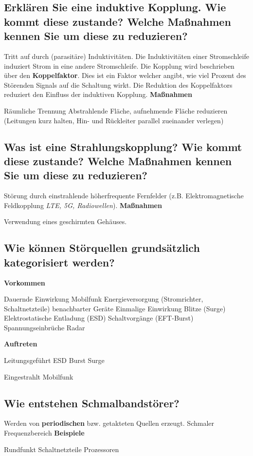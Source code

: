 \subsection{Erklären Sie eine induktive Kopplung. Wie kommt diese zustande? Welche Maßnahmen kennen Sie um diese zu reduzieren?}
Tritt auf durch (parasitäre) Induktivitäten. Die Induktivitäten einer Stromschleife induziert Strom in eine andere Stromschleife.\p
Die Kopplung wird beschrieben über den \textbf{Koppelfaktor}. Dies ist ein Faktor welcher angibt, wie viel Prozent des Störenden Signals auf die Schaltung wirkt. Die Reduktion des Koppelfaktors reduziert den Einfluss der induktiven Kopplung.\p
\textbf{Maßnahmen}
\begin{outline}
  \1 Räumliche Trennung
  \1 Abstrahlende Fläche, aufnehmende Fläche reduzieren (Leitungen kurz halten, Hin- und Rückleiter parallel zueinander verlegen)
\end{outline}

\subsection{Was ist eine Strahlungskopplung? Wie kommt diese zustande? Welche Maßnahmen kennen Sie um diese zu reduzieren?}
Störung durch einstrahlende höherfrequente Fernfelder (z.B. Elektromagnetische Feldkopplung \textit{LTE, 5G, Radiowellen}).\p
%
\textbf{Maßnahmen}
\begin{outline}
  \1 Verwendung eines geschirmten Gehäuses.
\end{outline}

\subsection{Wie können Störquellen grundsätzlich kategorisiert werden?}
\textbf{Vorkommen}
\begin{outline}
  \1 Dauernde Einwirkung
  \2 Mobilfunk
  \2 Energieversorgung (Stromrichter, Schaltnetzteile) benachbarter Geräte
  \1 Einmalige Einwirkung
  \2 Blitze (Surge)
  \2 Elektrostatische Entladung (ESD)
  \2 Schaltvorgänge (EFT-Burst)
  \2 Spannungseinbrüche
  \2 Radar
\end{outline}
%
\textbf{Auftreten}
\begin{outline}
  \1 Leitungsgeführt
  \2 ESD
  \2 Burst
  \2 Surge

  \1 Eingestrahlt
  \2 Mobilfunk
\end{outline}

\subsection{Wie entstehen Schmalbandstörer?}
Werden von \textbf{periodischen} bzw. getakteten Quellen erzeugt. Schmaler Frequenzbereich
\textbf{Beispiele}
\begin{outline}
  \1 Rundfunkt
  \1 Schaltnetzteile
  \1 Prozessoren
\end{outline}

